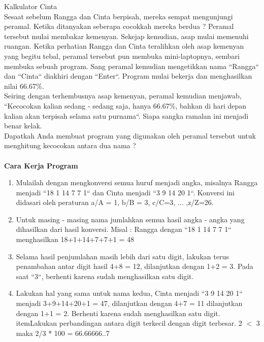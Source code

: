 \pagebreak
\begin{permasalahan}{Kalkulator Cinta}\\
\label{prob:KalkulatorCinta}
	Sesaat sebelum Rangga dan Cinta berpisah, mereka sempat mengunjungi peramal. Ketika ditanyakan seberapa cocokkah mereka berdua ? Peramal tersebut mulai membakar kemenyan. Sekejap kemudian, asap mulai memenuhi ruangan. Ketika perhatian Rangga dan Cinta teralihkan oleh asap kemenyan yang begitu tebal, peramal tersebut pun membuka mini-laptopnya, sembari membuka sebuah program. Sang peramal kemudian mengetikkan nama ``Rangga`` dan ``Cinta`` diakhiri dengan ``Enter``. Program mulai bekerja dan menghasilkan nilai 66.67\%. \\
	Seiring dengan terhembusnya asap kemenyan, peramal kemudian menjawab, ``Kecocokan kalian sedang - sedang saja, hanya 66.67\%, bahkan di hari depan kalian akan terpisah selama satu purnama``. Siapa sangka ramalan ini menjadi benar kelak.  \\
	Dapatkah Anda membuat program yang digunakan oleh peramal tersebut untuk menghitung kecocokan antara dua nama ? \\\\
	
	\textbf{Cara Kerja Program}\\
	\begin{enumerate}
		\item{Mulailah dengan mengkonversi semua huruf menjadi angka, misalnya Rangga menjadi ``18 1 14 7 7 1`` dan Cinta menjadi ``3 9 14 20 1``. Konversi ini didasari oleh peraturan a/A = 1, b/B = 3, c/C=3, ... ,z/Z=26.}
		\item{Untuk masing - masing nama jumlahkan semua hasil angka - angka yang dihasilkan dari hasil konversi. Misal : Rangga dengan ``18 1 14 7 7 1`` menghasilkan 18+1+14+7+7+1 = 48}
		\item{Selama hasil penjumlahan masih lebih dari satu digit, lakukan terus penambahan antar digit hasil 4+8 = 12, dilanjutkan dengan 1+2 = 3. Pada saat ``3``, berhenti karena sudah menghasilkan satu digit. }
		\item{Lakukan hal yang sama untuk nama kedua, Cinta menjadi ``3 9 14 20 1`` menjadi 3+9+14+20+1 = 47,  dilanjutkan dengan 4+7 = 11 dilanjutkan dengan 1+1 = 2. Berhenti karena sudah menghasilkan satu digit.}
		\\item{Lakukan perbandingan antara digit terkecil dengan digit terbesar. 2 $<$ 3 maka 2/3 * 100 = 66.66666..7}
		

\end{enumerate}
\end{permasalahan}
